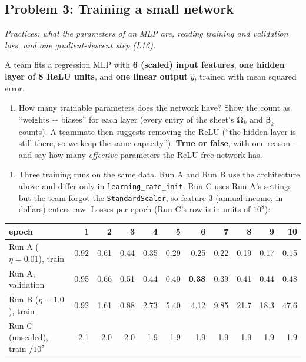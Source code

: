 \documentclass[
  11pt,
]{article}
\providecommand{\tightlist}{%
  \setlength{\itemsep}{0pt}\setlength{\parskip}{0pt}}
\newcommand{\answerpage}{\clearpage}
\begin{document}
\answerpage

\subsection{Problem 3: Training a small
network}\label{problem-3-training-a-small-network}

\emph{Practices: what the parameters of an MLP are, reading training and
validation loss, and one gradient-descent step (L16).}

A team fits a regression MLP with \textbf{6 (scaled) input features},
\textbf{one hidden layer of 8 ReLU units}, and \textbf{one linear
output} \(\hat y\), trained with mean squared error.

\begin{enumerate}
\def\labelenumi{(\alph{enumi})}
\tightlist
\item
  How many trainable parameters does the network have? Show the count as
  ``weights \(+\) biases'' for each layer (every entry of the sheet's
  \(\boldsymbol\Omega_k\) and \(\boldsymbol\beta_k\) counts). A teammate
  then suggests removing the ReLU (``the hidden layer is still there, so
  we keep the same capacity''). \textbf{True or false}, with one reason
  --- and say how many \emph{effective} parameters the ReLU-free network
  has.
\end{enumerate}

\begin{enumerate}
\def\labelenumi{(\alph{enumi})}
\setcounter{enumi}{1}
\tightlist
\item
  Three training runs on the same data. Run A and Run B use the
  architecture above and differ only in \texttt{learning\_rate\_init}.
  Run C uses Run A's settings but the team forgot the
  \texttt{StandardScaler}, so feature 3 (annual income, in dollars)
  enters raw. Losses per epoch (Run C's row is in units of \(10^8\)):
\end{enumerate}

\begin{center}\small\setlength{\tabcolsep}{4.5pt}
\begin{tabular}{@{}lrrrrrrrrrr@{}}\toprule
epoch & 1 & 2 & 3 & 4 & 5 & 6 & 7 & 8 & 9 & 10\\ \midrule
Run A ($\eta=0.01$), train      & 0.92 & 0.61 & 0.44 & 0.35 & 0.29 & 0.25 & 0.22 & 0.19 & 0.17 & 0.15\\
Run A, validation               & 0.95 & 0.66 & 0.51 & 0.44 & 0.40 & \textbf{0.38} & 0.39 & 0.41 & 0.44 & 0.48\\
Run B ($\eta=1.0$), train       & 0.92 & 1.61 & 0.88 & 2.73 & 5.40 & 4.12 & 9.85 & 21.7 & 18.3 & 47.6\\
Run C (unscaled), train $/10^8$ & 2.1 & 2.0 & 2.0 & 1.9 & 1.9 & 1.9 & 1.9 & 1.9 & 1.9 & 1.9\\
\bottomrule\end{tabular}\end{center}
\end{document}
